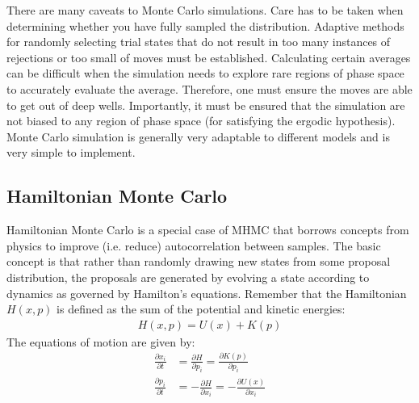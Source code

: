 \documentclass[book.tex]{subfiles}
\begin{document}
There are many caveats to Monte Carlo simulations. Care has to be taken when determining whether you have fully sampled the distribution. Adaptive methods for randomly selecting trial states that do not result in too many instances of rejections or too small of moves must be established. Calculating certain averages can be difficult when the simulation needs to explore rare regions of phase space to accurately evaluate the average. Therefore, one must ensure the moves are able to get out of deep  wells. Importantly, it must be ensured that the simulation are not biased to any region of phase space (for satisfying the ergodic hypothesis).  Monte Carlo simulation is generally very adaptable to different models and is very simple to implement. 



\subsection{Hamiltonian Monte Carlo}

Hamiltonian Monte Carlo is a special case of MHMC that borrows concepts from physics to improve (i.e. reduce) autocorrelation between samples. The basic concept is that rather than randomly drawing new states from some proposal distribution, the proposals are generated by evolving a state according to dynamics as governed by Hamilton's equations. Remember that the Hamiltonian $H(x, p)$ is defined as the sum of the potential and kinetic energies:
\begin{align}
H(x, p) = U(x) + K(p)
\end{align}  
The equations of motion are given by: 
\begin{align}
\frac{\partial x_i}{\partial t} &= \frac{\partial H}{\partial p_i} = \frac{\partial K( p)}{\partial p_i} \\
\frac{\partial p_i}{\partial t} &= -\frac{\partial H}{\partial x_i} = - \frac{\partial U( x)}{\partial x_i}
\end{align}
\end{document}

